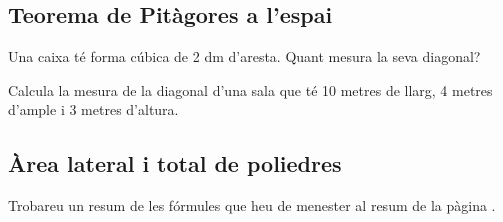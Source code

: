 \subsection{Teorema de Pitàgores a l'espai}

\begin{mylist}
\exer[1]  Una caixa té forma cúbica de 2 dm d'aresta. Quant mesura la seva diagonal?

\exer[1]  Calcula la mesura de la diagonal d'una sala que té 10 metres de llarg, 4 metres d'ample i 3 metres d'altura.
\end{mylist}
 


\subsection{Àrea lateral i total de poliedres}

\begin{theorybox}
	Trobareu un resum de les fórmules que heu de menester al resum de la pàgina \pageref{sec:resum11}.
\end{theorybox}


